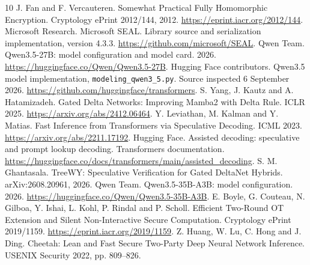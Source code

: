 \documentclass[10pt,twocolumn]{article}
\begin{document}
\begin{thebibliography}{10}
\small
{} J. Fan and F. Vercauteren. Somewhat Practical Fully Homomorphic
Encryption. Cryptology ePrint 2012/144, 2012. \url{https://eprint.iacr.org/2012/144}.
 Microsoft Research. Microsoft SEAL. Library source and
serialization implementation, version 4.3.3.
\url{https://github.com/microsoft/SEAL}.
 Qwen Team. Qwen3.5-27B: model configuration and model card.
2026. \url{https://huggingface.co/Qwen/Qwen3.5-27B}.
 Hugging Face contributors. Qwen3.5 model implementation,
\texttt{modeling\_qwen3\_5.py}. Source inspected 6 September 2026.
\url{https://github.com/huggingface/transformers}.
 S. Yang, J. Kautz and A. Hatamizadeh. Gated Delta Networks:
Improving Mamba2 with Delta Rule. ICLR 2025. \url{https://arxiv.org/abs/2412.06464}.
 Y. Leviathan, M. Kalman and Y. Matias. Fast Inference from
Transformers via Speculative Decoding. ICML 2023.
\url{https://arxiv.org/abs/2211.17192}.
 Hugging Face. Assisted decoding: speculative and prompt
lookup decoding. Transformers documentation.
\url{https://huggingface.co/docs/transformers/main/assisted_decoding}.
 S. M. Ghantasala. TreeWY: Speculative Verification for Gated
DeltaNet Hybrids. arXiv:2608.20961, 2026.
 Qwen Team. Qwen3.5-35B-A3B: model configuration. 2026.
\url{https://huggingface.co/Qwen/Qwen3.5-35B-A3B}.
 E. Boyle, G. Couteau, N. Gilboa, Y. Ishai, L. Kohl, P. Rindal
and P. Scholl. Efficient Two-Round OT Extension and Silent Non-Interactive
Secure Computation. Cryptology ePrint 2019/1159.
\url{https://eprint.iacr.org/2019/1159}.
 Z. Huang, W. Lu, C. Hong and J. Ding. Cheetah: Lean and Fast
Secure Two-Party Deep Neural Network Inference. USENIX Security 2022, pp. 809--826.
\end{thebibliography}
\end{document}
